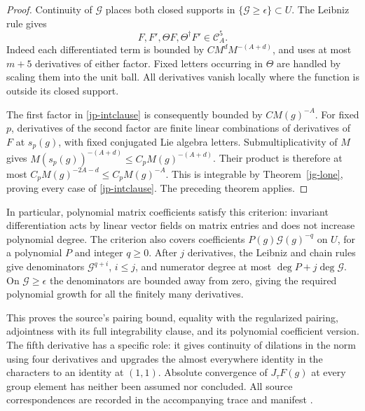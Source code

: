 \begin{proof}
Continuity of \(\mathcal G\) places both closed supports
in \(\{\mathcal G\geq\epsilon\}\subset U\).
The Leibniz rule gives
\[
                  F,F',\Theta F,\Theta^\dagger F'
                                           \in\mathcal C_A^5 .
\]
Indeed each differentiated term is bounded by
\(C M^d M^{-(A+d)}\), and uses at most \(m+5\)
derivatives of either factor.  Fixed letters occurring in
\(\Theta\) are handled by scaling them into the unit ball.
All derivatives vanish locally where the function is
outside its closed support.

The first factor in \eqref{jp-intclause} is consequently
bounded by \(C M(g)^{-A}\).
For fixed \(p\), derivatives of the second factor are
finite linear combinations of derivatives of \(F\) at
\(s_p(g)\), with fixed conjugated Lie algebra letters.
Submultiplicativity of \(M\) gives
\(M(s_p(g))^{-(A+d)}\leq C_pM(g)^{-(A+d)}\).
Their product is therefore at most
\(C_p M(g)^{-2A-d}\leq C_pM(g)^{-A}\).
This is integrable by Theorem~\ref{jg-lone}, proving
every case of \eqref{jp-intclause}.
The preceding theorem applies.
\end{proof}

In particular, polynomial matrix coefficients satisfy this
criterion: invariant differentiation acts by linear vector
fields on matrix entries and does not increase polynomial
degree.  The criterion also covers coefficients
\(P(g)\mathcal G(g)^{-q}\) on \(U\), for a polynomial \(P\)
and integer \(q\geq0\).  After \(j\) derivatives, the
Leibniz and chain rules give denominators
\(\mathcal G^{q+i}\), \(i\leq j\), and numerator degree at
most \(\deg P+j\deg\mathcal G\).
On \(\mathcal G\geq\epsilon\) the denominators are bounded
away from zero, giving the required polynomial growth for
all the finitely many derivatives.

This proves the source's pairing bound, equality with the
regularized pairing, adjointness with its full integrability
clause, and its polynomial coefficient version.
The fifth derivative has a specific role: it gives continuity
of dilations in the norm using four derivatives and upgrades
the almost everywhere identity in the characters to an
identity at \((1,1)\).
Absolute convergence of \(J_\tau F(g)\) at every group
element has neither been assumed nor concluded.
All source correspondences are recorded in the accompanying
trace and manifest \cite{alpo-uniform-source}.


